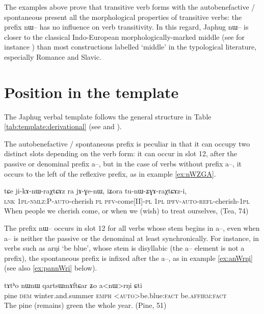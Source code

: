 \documentclass[oldfontcommands,oneside,a4paper,11pt]{article}
\newcommand{\ipa}[1]{{\phon \mbox{#1}}} %
\begin{document}
The examples above prove that transitive verb forms with the autobenefactive / spontaneous present all the morphological  properties of transitive verbs: the prefix \ipa{nɯ--} has no influence on verb transitivity. In this regard, Japhug \ipa{nɯ--} is closer to the classical Indo-European morphologically-marked middle (see for instance  \citealt[19]{pooth14diathesen}) than most constructions labelled `middle' in the typological literature, especially Romance and Slavic.

\section{Position in the template}
The Japhug verbal template follows the general structure in Table \ref{tab:template:derivational} (see \citealt{jacques12incorp} and \citealt{jacques13harmonization}). 

The autobenefactive / spontaneous prefix is peculiar in that it can occupy two distinct slots depending on the verb form: it can occur  in slot 12, after the passive or denominal prefix \ipa{a--}, but in the case of verbs without prefix \ipa{a--}, it occurs to the left of the reflexive prefix, as in example \ref{ex:nWZGA}.

\begin{exe}
\ex \label{ex:nWZGA}
\gll 
\ipa{tɕe}  	\ipa{ji-kɤ-nɯ-raχtɕɤz}  	\ipa{ra}  	\ipa{jɤ-ɣe-nɯ,}  	\ipa{iʑora}  	\ipa{tu-nɯ-ʑɣɤ-raχtɕɤz-i,}  \\
\textsc{lnk} \textsc{1pl-nmlz:P-auto}-cherish \textsc{pl} \textsc{pfv}-come[II]-\textsc{pl} \textsc{1pl} \textsc{ipfv-auto-refl}-cherish-\textsc{1pl} \\
\glt When people we cherish come, or when we (wish) to treat ourselves, (Tea, 74)
\end{exe}

The prefix \ipa{nɯ--} occurs in slot 12 for all verbs whose stem begins in \ipa{a--}, even when   \ipa{a--} is neither the passive or the denominal at least synchronically. For instance, in verbs such as \ipa{arŋi} `be blue', whose stem is disyllabic (the \ipa{a--} element is not a prefix), the spontaneous prefix is infixed after the \ipa{a--}, as in  example \ref{ex:anWrŋi} (see also \ref{ex:pannWri} below).

\begin{exe}
\ex \label{ex:anWrŋi}
\gll 
\ipa{tɤtʰo}  	\ipa{nɯnɯ}  	\ipa{qartsɯmɤftɕar}  	\ipa{ʑo}  	\ipa{a<nɯ>rŋi}  	\ipa{ɕti}  \\
pine \textsc{dem} winter.and.summer \textsc{emph} <\textsc{auto}>be.blue:\textsc{fact} be.\textsc{affirm:fact} \\
\glt The pine (remains) green the whole year. (Pine, 51)
\end{exe}
 
\end{document}
